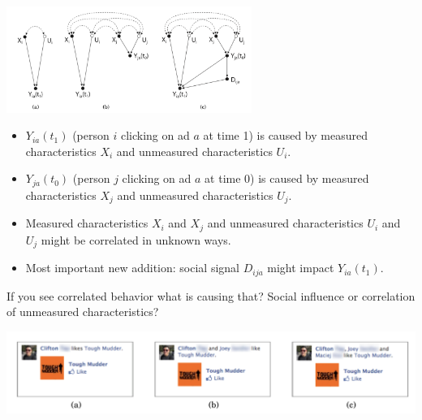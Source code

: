 \documentclass[aspectratio=169]{beamer}
\begin{document}
\begin{frame}

\begin{center}
\includegraphics[width=0.6\textwidth]{figures/bakshy_social_2012_fig1}
\end{center}

\begin{itemize}
\item $Y_{ia}(t_1)$ (person $i$ clicking on ad $a$ at time 1) is caused by measured characteristics $X_i$ and unmeasured characteristics $U_i$. \pause
\item $Y_{ja}(t_0)$ (person $j$ clicking on ad $a$ at time 0) is caused by measured characteristics $X_j$ and unmeasured characteristics $U_j$. \pause
\item Measured characteristics $X_i$ and $X_j$ and unmeasured characteristics $U_i$ and $U_j$ might be correlated in unknown ways. \pause
\item Most important new addition: social signal $D_{ija}$ might impact $Y_{ia}(t_1)$.
\end{itemize}

If you see correlated behavior what is causing that?  Social influence or correlation of unmeasured characteristics?

\end{frame}
\begin{frame}

\begin{center}
\includegraphics[width=\textwidth]{figures/bakshy_social_2012_fig2}
\end{center}

\end{frame}
\end{document}
